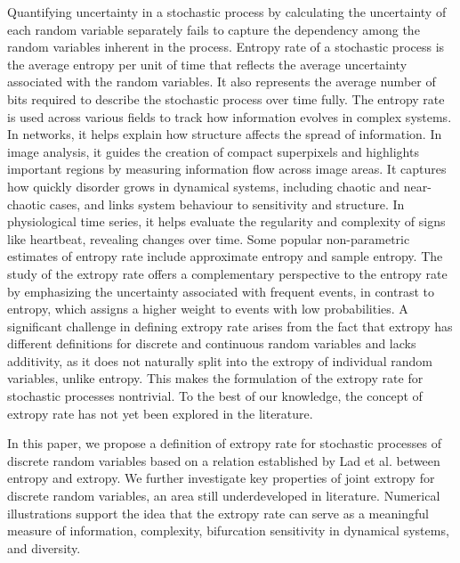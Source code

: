 \documentclass[pdflatex]{sn-jnl}%
\theoremstyle{thmstyleone}
\theoremstyle{thmstyletwo}%
\theoremstyle{thmstylethree}%
\begin{document}
 
Quantifying uncertainty in a stochastic process by calculating the uncertainty of each random variable separately fails to capture the dependency among the random variables inherent in the process. Entropy rate of a stochastic process is the average entropy per unit of time that reflects the average uncertainty associated with the random variables. It also represents the average number of bits required to describe the stochastic process over time fully. The entropy rate is used across various fields to track how information evolves in complex systems\cite{gomez2008entropy}. In networks, it helps explain how structure affects the spread of information\cite{latora1999kolmogorov}. In image analysis, it guides the creation of compact superpixels and highlights important regions by measuring information flow across image areas\cite{liu2011entropy,wang2010measuring}. It captures how quickly disorder grows in dynamical systems, including chaotic and near-chaotic cases, and links system behaviour to sensitivity and structure\cite{latora2000rate}. In physiological time series, it helps evaluate the regularity and complexity of signs like heartbeat, revealing changes over time\cite{porta2002entropy}. Some popular non-parametric estimates of entropy rate include approximate entropy\cite{pincus1991approximate} and sample entropy\cite{richman2004sample}. The study of the extropy rate offers a complementary perspective to the entropy rate by emphasizing the uncertainty associated with frequent events, in contrast to entropy, which assigns a higher weight to events with low probabilities. A significant challenge in defining extropy rate arises from the fact that extropy has different definitions for discrete and continuous random variables and lacks additivity, as it does not naturally split into the extropy of individual random variables, unlike entropy. This makes the formulation of the extropy rate for stochastic processes nontrivial. To the best of our knowledge, the concept of extropy rate has not yet been explored in the literature.

In this paper, we propose a definition of extropy rate for stochastic processes of discrete random variables based on a relation established by Lad et al. \cite{lad2015extropy} between entropy and extropy. We further investigate key properties of joint extropy for discrete random variables, an area still underdeveloped in literature. Numerical illustrations support the idea that the extropy rate can serve as a meaningful measure of information, complexity, bifurcation sensitivity in dynamical systems, and diversity.
\end{document}
